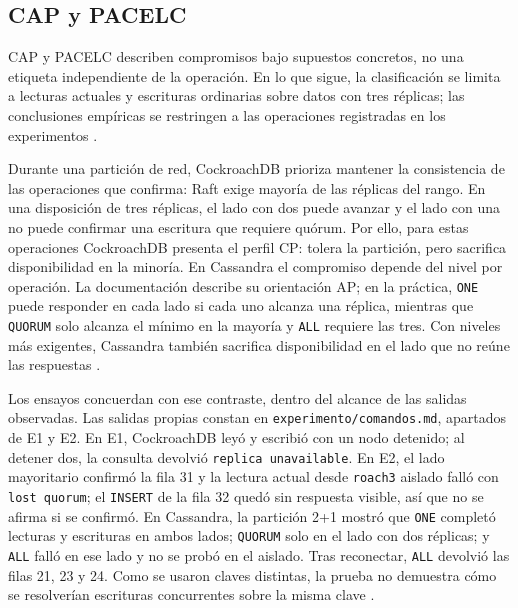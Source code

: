 \documentclass[11pt,a4paper]{article}
\begin{document}
\subsection{CAP y PACELC}

CAP y PACELC describen compromisos bajo supuestos concretos, no una etiqueta independiente de la operación. En lo que sigue, la clasificación se limita a lecturas actuales y escrituras ordinarias sobre datos con tres réplicas; las conclusiones empíricas se restringen a las operaciones registradas en los experimentos \cite{cockroachlabsReplication,apacheCassandraDynamo,apacheCassandraGuarantees}.

Durante una partición de red, CockroachDB prioriza mantener la consistencia de las operaciones que confirma: Raft exige mayoría de las réplicas del rango. En una disposición de tres réplicas, el lado con dos puede avanzar y el lado con una no puede confirmar una escritura que requiere quórum. Por ello, para estas operaciones CockroachDB presenta el perfil CP: tolera la partición, pero sacrifica disponibilidad en la minoría. En Cassandra el compromiso depende del nivel por operación. La documentación describe su orientación AP; en la práctica, \texttt{ONE} puede responder en cada lado si cada uno alcanza una réplica, mientras que \texttt{QUORUM} solo alcanza el mínimo en la mayoría y \texttt{ALL} requiere las tres. Con niveles más exigentes, Cassandra también sacrifica disponibilidad en el lado que no reúne las respuestas \cite{cockroachlabsReplication,apacheCassandraDynamo,apacheCassandraGuarantees}.

Los ensayos concuerdan con ese contraste, dentro del alcance de las salidas observadas. Las salidas propias constan en \texttt{experimento/comandos.md}, apartados de E1 y E2. En E1, CockroachDB leyó y escribió con un nodo detenido; al detener dos, la consulta devolvió \texttt{replica unavailable}. En E2, el lado mayoritario confirmó la fila 31 y la lectura actual desde \texttt{roach3} aislado falló con \texttt{lost quorum}; el \texttt{INSERT} de la fila 32 quedó sin respuesta visible, así que no se afirma si se confirmó. En Cassandra, la partición 2+1 mostró que \texttt{ONE} completó lecturas y escrituras en ambos lados; \texttt{QUORUM} solo en el lado con dos réplicas; y \texttt{ALL} falló en ese lado y no se probó en el aislado. Tras reconectar, \texttt{ALL} devolvió las filas 21, 23 y 24. Como se usaron claves distintas, la prueba no demuestra cómo se resolverían escrituras concurrentes sobre la misma clave \cite{cockroachlabsReplication,apacheCassandraDynamo}.
\end{document}
